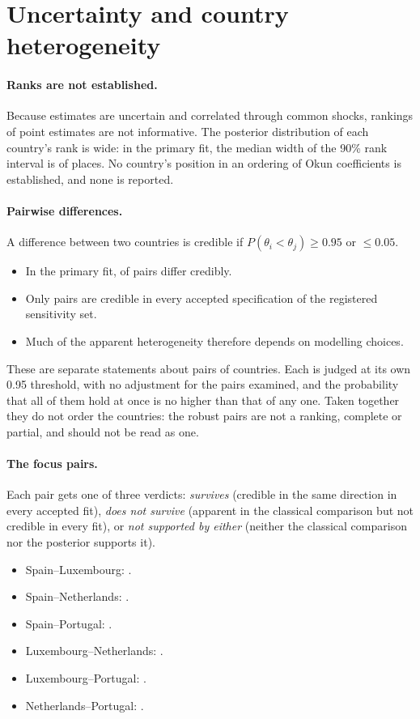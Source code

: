 \section{Uncertainty and country heterogeneity}\label{sec:heterogeneity}

\paragraph{Ranks are not established.} Because estimates are uncertain and correlated
through common shocks, rankings of point estimates are not informative. The posterior
distribution of each country's rank is wide: in the primary fit, the median width of the
90\% rank interval is  of  places. No country's position
in an ordering of Okun coefficients is established, and none is reported.

\paragraph{Pairwise differences.} A difference between two countries is credible if
$P(\theta_i<\theta_j)\ge 0.95$ or $\le 0.05$.
\begin{itemize}
  \item In the primary fit,  of  pairs differ
    credibly.
  \item Only  pairs are credible in every accepted specification of
    the registered sensitivity set.
  \item Much of the apparent heterogeneity therefore depends on modelling choices.
\end{itemize}
These are separate statements about pairs of countries. Each is judged at its own 0.95
threshold, with no adjustment for the  pairs examined, and the
probability that all of them hold at once is no higher than that of any one. Taken together
they do not order the countries: the robust pairs are not a ranking, complete or partial,
and should not be read as one.

\paragraph{The focus pairs.} Each pair gets one of three verdicts:
\emph{survives} (credible in the same direction in every accepted fit), \emph{does not
survive} (apparent in the classical comparison but not credible in every fit), or
\emph{not supported by either} (neither the classical comparison nor the posterior
supports it).
\begin{itemize}
  \item Spain--Luxembourg: .
  \item Spain--Netherlands: .
  \item Spain--Portugal: .
  \item Luxembourg--Netherlands: .
  \item Luxembourg--Portugal: .
  \item Netherlands--Portugal: .
\end{itemize}

